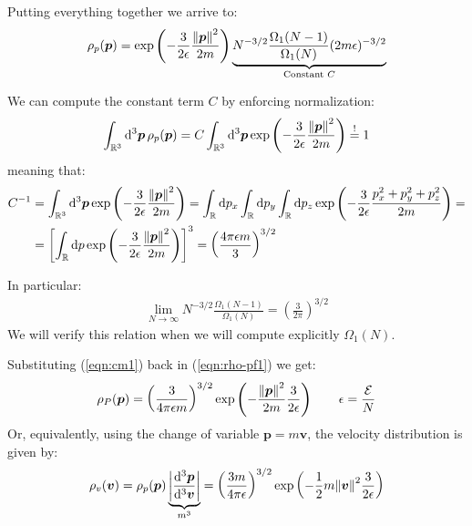 \documentclass[../template.tex]{subfiles}
\begin{document}
Putting everything together we arrive to:
\begin{align}\label{eqn:rho-pf1}
    \rho_p(\bm{p}) = \exp\left(-\frac{3}{2 \epsilon} \frac{\norm{\bm{p}}^2}{2m} \right) \underbrace{N^{-3/2} \frac{\Omega_1(N-1)}{\Omega_1(N)} (2m \epsilon)^{-3/2}}_{\text{Constant $C$}} 
\end{align}

We can compute the constant term $C$ by enforcing normalization:
\begin{align*}
    \int_{\mathbb{R}^3} \dd[3]{\bm{p}} \rho_p(\bm{p}) = C \int_{\mathbb{R}^3} \dd[3]{\bm{p}} \exp\left(-\frac{3}{2 \epsilon} \frac{\norm{\bm{p}}^2}{2m}  \right) \overset{!}{=}  1
\end{align*}
meaning that:
\begin{align}\nonumber
    C^{-1} &= \int_{\mathbb{R}^3} \dd[3]{\bm{p}} \exp\left(-\frac{3}{2 \epsilon} \frac{\norm{\bm{p}}^2}{2m}  \right) = \int_{\mathbb{R}} \dd{p_x} \int_{\mathbb{R}}\dd{p_y} \int_{\mathbb{R}} \dd{p_z} \exp\left(-\frac{3}{2 \epsilon} \frac{p_x^2 + p_y^2 + p_z^2}{2m}  \right) =\\
    &=\left[\int_{\mathbb{R}} \dd{p} \exp\left(-\frac{3}{2 \epsilon} \frac{\norm{\bm{p}}^2}{2m}  \right)\right]^3 = \left(\frac{4 \pi \epsilon m}{3} \right)^{3/2} \label{eqn:cm1}
\end{align}

In particular:
\begin{align*}
    \lim_{N \to \infty} N^{-3/2} \frac{\Omega_1(N-1)}{\Omega_1(N)}  = \left(\frac{3}{2 \pi} \right)^{3/2}
\end{align*}
We will verify this relation when we will compute explicitly $\Omega_1(N)$.

\medskip

Substituting (\ref{eqn:cm1}) back in (\ref{eqn:rho-pf1}) we get:
\begin{align} \label{eqn:rho-p-f}
    \rho_P(\bm{p}) = \left(\frac{3}{4 \pi \epsilon m} \right)^{3/2} \exp\left(-\frac{\norm{\bm{p}}^2}{2m}  \frac{3}{2 \epsilon} \right) \qquad \epsilon = \frac{\mathcal{E}}{N} 
\end{align}
Or, equivalently, using the change of variable $\bm{p} = m \bm{v}$, the velocity distribution is given by:
\begin{align} \label{eqn:rho-p-v}
    \rho_v(\bm{v}) = \rho_p(\bm{p}) \underbrace{\left|\frac{\dd[3]{\bm{p}}}{\dd[3]{\bm{v}}}\right|}_{m^3} = \left(\frac{3m}{4 \pi \epsilon} \right)^{3/2} \exp\left(-\frac{1}{2}m\norm{\bm{v}}^2 \frac{3}{2 \epsilon}  \right)
\end{align}
\end{document}
